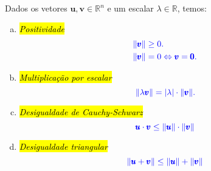\begin{prop}
  Dados os vetores $\pmb{u},\pmb{v} \in \mathbb{R}^n$ e um escalar $\lambda\in\mathbb{R}$, temos:
  \begin{enumerate}[a)]
  \item \hl{\emph{Positividade}}
    \begin{align}
      &\color{blue}\|\pmb{v}\| \geq 0.\\
      &\color{blue}\|\pmb{v}\| = 0 \Leftrightarrow \pmb{v} = \pmb{0}.
    \end{align}
    
  \item \hl{\emph{Multiplicação por escalar}}
    \begin{equation}\color{blue}\|\lambda \pmb{v}\| = |\lambda|\cdot \|\pmb{v}\|.
    \end{equation}
    
  \item \hl{\emph{Desigualdade de Cauchy}}{\cauchy}\hl{\emph{-Schwarz}}{\schwarz}
    \begin{equation}\label{cap_sislin_sec_ncond:eq:cauchy-schwarz}
      \color{blue}\pmb{u}\cdot \pmb{v} \leq \|\pmb{u}\|\cdot\|\pmb{v}\|
    \end{equation}

  \item \hl{\emph{Desigualdade triangular}}
    \begin{equation}\label{cap_sislin_sec_ncond:eq:destria}
      \color{blue}\|\pmb{u}+\pmb{v}\| \leq \|\pmb{u}\| + \|\pmb{v}\|
    \end{equation}
  \end{enumerate}
\end{prop}
